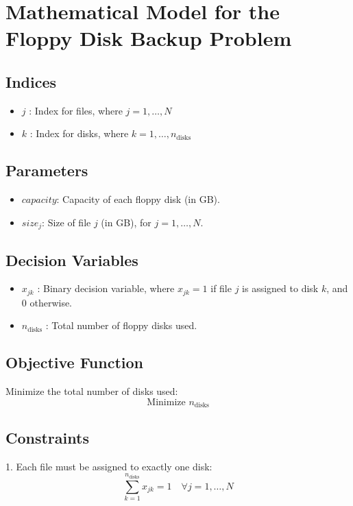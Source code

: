\documentclass{article}
\begin{document}
\section*{Mathematical Model for the Floppy Disk Backup Problem}

\subsection*{Indices}
\begin{itemize}
    \item $j$ : Index for files, where $j = 1, \ldots, N$
    \item $k$ : Index for disks, where $k = 1, \ldots, n_{\text{disks}}$
\end{itemize}

\subsection*{Parameters}
\begin{itemize}
    \item $capacity$: Capacity of each floppy disk (in GB).
    \item $size_j$: Size of file $j$ (in GB), for $j = 1, \ldots, N$.
\end{itemize}

\subsection*{Decision Variables}
\begin{itemize}
    \item $x_{jk}$ : Binary decision variable, where $x_{jk} = 1$ if file $j$ is assigned to disk $k$, and $0$ otherwise.
    \item $n_{\text{disks}}$ : Total number of floppy disks used.
\end{itemize}

\subsection*{Objective Function}
Minimize the total number of disks used:
\[
\text{Minimize } n_{\text{disks}}
\]

\subsection*{Constraints}
1. Each file must be assigned to exactly one disk:
\[
\sum_{k=1}^{n_{\text{disks}}} x_{jk} = 1 \quad \forall j = 1, \ldots, N
\]
\end{document}

